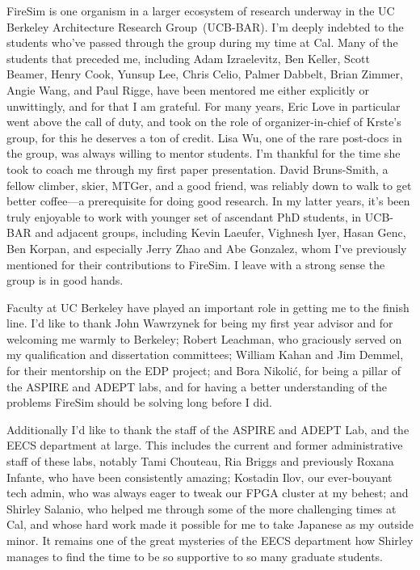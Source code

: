 FireSim is one organism in a larger ecosystem of research underway in the UC Berkeley
Architecture Research Group~(UCB-BAR). I'm deeply indebted to the students
who've passed through the group during my time at Cal. Many of the students
that preceded me, including Adam Izraelevitz, Ben Keller, Scott Beamer, Henry
Cook, Yunsup Lee, Chris Celio, Palmer Dabbelt, Brian Zimmer, Angie Wang, and Paul
Rigge, have been mentored me either explicitly or unwittingly, and for that I
am grateful. For many years, Eric Love in particular went above the call of
duty, and took on the role of organizer-in-chief of Krste's group, for this he
deserves a ton of credit. Lisa Wu, one of the rare post-docs in the group, was
always willing to mentor students. I'm thankful for the time she took to coach
me through my first paper presentation. David Bruns-Smith, a fellow climber,
skier, MTGer, and a good friend, was reliably down to walk to get better
coffee---a prerequisite for doing good research. In my latter years, it's been
truly enjoyable to work with younger set of ascendant PhD students, in UCB-BAR
and adjacent groups, including Kevin Laeufer, Vighnesh Iyer, Hasan Genc, Ben
Korpan, and especially Jerry Zhao and Abe Gonzalez, whom I've previously
mentioned for their contributions to FireSim. I leave with a strong sense the
group is in good hands.

Faculty at UC Berkeley have played an important role in getting me to
the finish line. I'd like to thank John Wawrzynek for being my first year
advisor and for welcoming me warmly to Berkeley; Robert Leachman, who
graciously served on my qualification and dissertation committees; William
Kahan and Jim Demmel, for their mentorship on the EDP project; and Bora Nikoli\'c, for being a
pillar of the ASPIRE and ADEPT labs, and for having a better understanding of the
problems FireSim should be solving long before I did.

Additionally I'd like to thank the staff of the ASPIRE and ADEPT Lab, and the
EECS department at large. This includes the current and former administrative
staff of these labs, notably Tami Chouteau, Ria Briggs and previously Roxana
Infante, who have been consistently amazing; Kostadin Ilov, our ever-bouyant
tech admin, who was always eager to tweak our FPGA cluster at my behest; and
Shirley Salanio, who helped me through some of the more challenging times at
Cal, and whose hard work made it possible for me to take Japanese as my outside
minor. It remains one of the great mysteries of the EECS department how Shirley
manages to find the time to be so supportive to so many graduate students.

